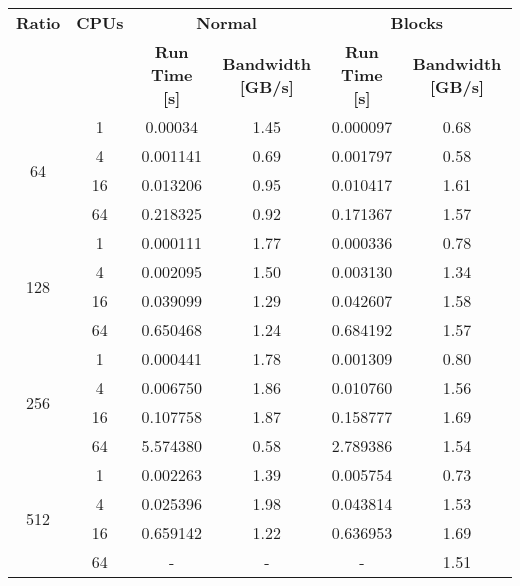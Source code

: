 \begin{tabularx}{\textwidth}{@{} c c c c c c @{}}
    \caption{\label{table:weak-scaling}Weak scaling}\\
    \toprule
        \textbf{Ratio} & \textbf{CPUs} & \multicolumn{2}{c}{\textbf{Normal}} & \multicolumn{2}{c}{\textbf{Blocks}}\\
        \cmidrule(lr){3-4}\cmidrule(lr){5-6}
        & & \textbf{Run Time [s]} & \textbf{Bandwidth [GB/s]} & \textbf{Run Time [s]} & \textbf{Bandwidth [GB/s]} \\
    \midrule
    \endhead
        \multirow{4}{*}{64} & 1  & 0.00034 & 1.45 & 0.000097 & 0.68 \\
                            & 4  & 0.001141 & 0.69 & 0.001797 & 0.58 \\
                            & 16 & 0.013206 & 0.95 & 0.010417 & 1.61 \\
                            & 64 & 0.218325 & 0.92 & 0.171367 & 1.57 \\
    \midrule
        \multirow{4}{*}{128} & 1  & 0.000111 & 1.77 & 0.000336 & 0.78 \\
                             & 4  & 0.002095 & 1.50 & 0.003130 & 1.34 \\
                             & 16 & 0.039099 & 1.29 & 0.042607 & 1.58 \\
                             & 64 & 0.650468 & 1.24 & 0.684192 & 1.57 \\
    \midrule
        \multirow{4}{*}{256} & 1  & 0.000441 & 1.78 & 0.001309 & 0.80 \\
                             & 4  & 0.006750 & 1.86 & 0.010760 & 1.56 \\
                             & 16 & 0.107758 & 1.87 & 0.158777 & 1.69 \\
                             & 64 & 5.574380 & 0.58 & 2.789386 & 1.54 \\
    \midrule
        \multirow{4}{*}{512} & 1  & 0.002263 & 1.39 & 0.005754 & 0.73 \\
                             & 4  & 0.025396 & 1.98 & 0.043814 & 1.53 \\
                             & 16 & 0.659142 & 1.22 & 0.636953 & 1.69 \\
                             & 64 & - & - & - & 1.51 \\
    \bottomrule
\end{tabularx}